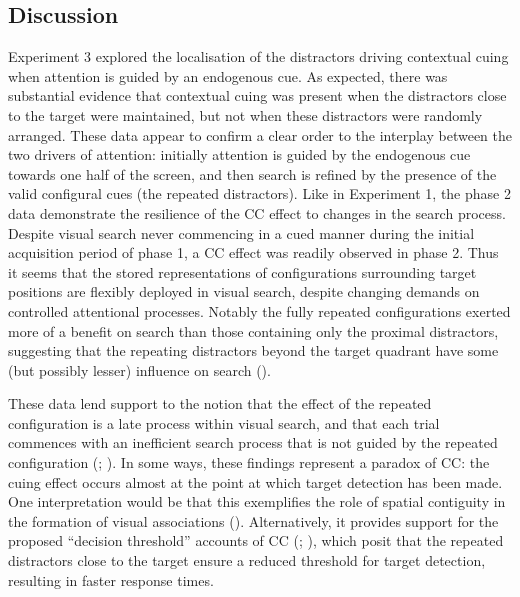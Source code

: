 \documentclass[
  man,
  floatsintext,
  longtable,
  nolmodern,
  notxfonts,
  notimes,
  colorlinks=true,linkcolor=blue,citecolor=blue,urlcolor=blue]{apa7}
\begin{document}
\subsection{Discussion}\label{discussion-2}

Experiment 3 explored the localisation of the distractors driving
contextual cuing when attention is guided by an endogenous cue. As
expected, there was substantial evidence that contextual cuing was
present when the distractors close to the target were maintained, but
not when these distractors were randomly arranged. These data appear to
confirm a clear order to the interplay between the two drivers of
attention: initially attention is guided by the endogenous cue towards
one half of the screen, and then search is refined by the presence of
the valid configural cues (the repeated distractors). Like in Experiment
1, the phase 2 data demonstrate the resilience of the CC effect to
changes in the search process. Despite visual search never commencing in
a cued manner during the initial acquisition period of phase 1, a CC
effect was readily observed in phase 2. Thus it seems that the stored
representations of configurations surrounding target positions are
flexibly deployed in visual search, despite changing demands on
controlled attentional processes. Notably the fully repeated
configurations exerted more of a benefit on search than those containing
only the proximal distractors, suggesting that the repeating distractors
beyond the target quadrant have some (but possibly lesser) influence on
search ().

These data lend support to the notion that the effect of the repeated
configuration is a late process within visual search, and that each
trial commences with an inefficient search process that is not guided by
the repeated configuration (; ). In some ways, these
findings represent a paradox of CC: the cuing effect occurs almost at
the point at which target detection has been made. One interpretation
would be that this exemplifies the role of spatial contiguity in the
formation of visual associations (). Alternatively, it provides support for the proposed
``decision threshold'' accounts of CC (; ), which posit
that the repeated distractors close to the target ensure a reduced
threshold for target detection, resulting in faster response times.
\end{document}

